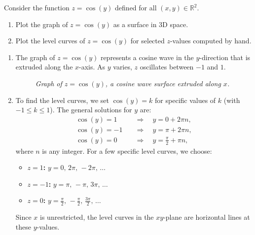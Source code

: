 \exampleline
\begin{example}
Consider the function \( z = \cos(y) \) defined for all \( (x, y) \in \mathbb{R}^2 \).

\begin{enumerate}
    \item Plot the graph of \( z = \cos(y) \) as a surface in 3D space.
    \item Plot the level curves of \( z = \cos(y) \) for selected \( z \)-values computed by hand.
\end{enumerate}

\begin{solution}
\begin{enumerate}
    \item The graph of \( z = \cos(y) \) represents a cosine wave in the \( y \)-direction that is extruded along the \( x \)-axis. As \( y \) varies, \( z \) oscillates between \(-1\) and \(1\).

    \begin{figure}[H]
        \centering
        \caption{\textit{Graph of \( z = \cos(y) \), a cosine wave surface extruded along \( x \).}}
        \label{fig:surface_cos_y}
    \end{figure}

    \item To find the level curves, we set \( \cos(y)=k \) for specific values of \( k \) (with \( -1 \le k \le 1 \)). The general solutions for \( y \) are:
    \[
    \begin{aligned}
    \cos(y) = 1 \quad &\Longrightarrow \quad y = 0 + 2\pi n,\\[6pt]
    \cos(y) = -1 \quad &\Longrightarrow \quad y = \pi + 2\pi n,\\[6pt]
    \cos(y) = 0 \quad &\Longrightarrow \quad y = \frac{\pi}{2} + \pi n,
    \end{aligned}
    \]
    where \( n \) is any integer. For a few specific level curves, we choose:
    \begin{itemize}
        \item \textbf{\( z=1 \):} \( y = 0,\, 2\pi,\, -2\pi,\, \ldots \)
        \item \textbf{\( z=-1 \):} \( y = \pi,\, -\pi,\, 3\pi,\, \ldots \)
        \item \textbf{\( z=0 \):} \( y = \frac{\pi}{2},\, -\frac{\pi}{2},\, \frac{3\pi}{2},\, \ldots \)
    \end{itemize}
    Since \( x \) is unrestricted, the level curves in the \( xy \)-plane are horizontal lines at these \( y \)-values.


\end{enumerate}
\end{solution}
\end{example}
